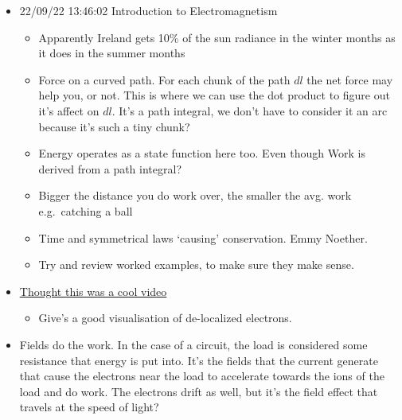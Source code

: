 \documentclass[11pt]{article}
\begin{document}
\begin{itemize}
\tightlist
\item
  22/09/22 13:46:02 Introduction to Electromagnetism

  \begin{itemize}
  \tightlist
  \item
    Apparently Ireland gets 10\% of the sun radiance in the winter
    months as it does in the summer months
  \item
    Force on a curved path. For each chunk of the path \(dl\) the net
    force may help you, or not. This is where we can use the dot product
    to figure out it's affect on \(dl\). It's a path integral, we don't
    have to consider it an arc because it's such a tiny chunk?
  \item
    Energy operates as a state function here too. Even though Work is
    derived from a path integral?
  \item
    Bigger the distance you do work over, the smaller the avg. work
    e.g.~catching a ball
  \item
    Time and symmetrical laws `causing' conservation. Emmy Noether.
  \item
    Try and review worked examples, to make sure they make sense.
  \end{itemize}
\item
  \href{https://www.youtube.com/watch?v=KGJqykotjog}{Thought this was a
  cool video}

  \begin{itemize}
  \tightlist
  \item
    Give's a good visualisation of de-localized electrons.
  \end{itemize}
\item
  Fields do the work. In the case of a circuit, the load is considered
  some resistance that energy is put into. It's the fields that the
  current generate that cause the electrons near the load to accelerate
  towards the ions of the load and do work. The electrons drift as well,
  but it's the field effect that travels at the speed of light?
\end{itemize}
\end{document}
